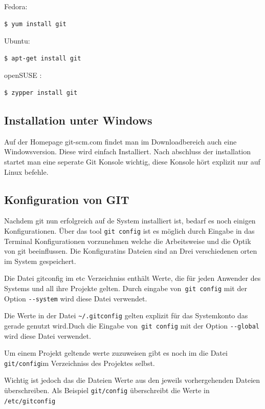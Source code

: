 \documentclass[12pt,a4paper,bibliography=totocnumbered,listof=totocnumbered]{scrartcl}
\begin{document}
Fedora:
\begin{lstlisting}
$ yum install git
 \end{lstlisting}

Ubuntu:
\begin{lstlisting}
$ apt-get install git
 \end{lstlisting}

openSUSE :
\begin{lstlisting}
$ zypper install git
 \end{lstlisting}



\subsection{Installation unter Windows}
Auf der Homepage git-scm.com findet man im Downloadbereich auch eine Windowsversion.
Diese wird einfach Installiert. Nach abschluss der installation startet man eine seperate Git Konsole wichtig, diese Konsole hört explizit nur auf Linux befehle. 

\subsection{Konfiguration von GIT}
Nachdem git nun erfolgreich auf de System installiert ist, bedarf es noch einigen Konfigurationen. Über das tool \lstinline|git config| ist es möglich durch Eingabe in das Terminal Konfigurationen vorzunehmen welche die Arbeitsweise und die Optik von git beeinflussen. Die Konfiguratins Dateien sind an Drei verschiedenen orten im System
gespeichert. 
\begin{compactitem}
	\item Die Datei gitconfig im etc Verzeichniss enthält Werte, die für jeden Anwender des Systems und all ihre Projekte gelten. Durch eingabe von\lstinline| git config| mit der Option \lstinline|--system| wird diese Datei verwendet.
\item Die Werte in der Datei \lstinline|~/.gitconfig| gelten explizit für das Systemkonto das gerade genutzt wird.Duch die Eingabe von\lstinline| git config| mit der Option \lstinline|--global| wird diese Datei verwendet. 
\item Um einem Projekt geltende werte zuzuweisen gibt es noch im die Datei \lstinline|git/config|im Verzeichniss des Projektes selbst. 
\end{compactitem}
Wichtig ist jedoch das die Dateien Werte aus den jeweils vorhergehenden Dateien überschreiben. Als Beispiel \lstinline|git/config| überschreibt die Werte in \lstinline|/etc/gitconfig|
\end{document}
